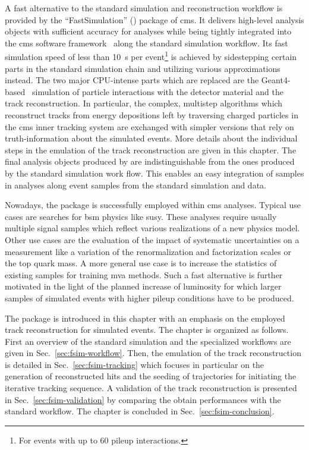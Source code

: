 A fast alternative to the standard simulation and reconstruction workflow is provided by the ``FastSimulation'' (\FSIM[format=hyperbf]) package of \gls{cms}. It delivers high-level analysis objects with sufficient accuracy for analyses while being tightly integrated into the \gls{cms} software framework~\cite{Bayatian:922757} along the standard simulation workflow. Its fast simulation speed of less than 10~s per event\footnote{For events with up to 60 pileup interactions.} is achieved by sidestepping certain parts in the standard simulation chain and utilizing various approximations instead. The two major CPU-intense parts which are replaced are the Geant4-based~\cite{Agostinelli2003250} simulation of particle interactions with the detector material and the track reconstruction. In particular, the complex, multistep algorithms which reconstruct tracks from energy depositions left by traversing charged particles in the \gls{cms} inner tracking system are exchanged with simpler versions that rely on truth-information about the simulated events. More details about the individual steps in the emulation of the track reconstruction are given in this chapter. The final analysis objects produced by \FSIM are indistinguishable from the ones produced by the standard simulation work flow. This enables an easy integration of \FSIM samples in analyses along event samples from the standard simulation and data.

Nowadays, the \FSIM package is successfully employed within \gls{cms} analyses. Typical use cases are searches for \acrfull{bsm} physics like \acrfull{susy}. These analyses require usually multiple signal samples which reflect various realizations of a new physics model. Other use cases are the evaluation of the impact of systematic uncertainties on a measurement like a variation of the renormalization and factorization scales or the top quark mass. A more general use case is to increase the statistics of existing samples for training \acrfull{mva} methods. Such a fast alternative is further motivated in the light of the planned increase of luminosity for which larger samples of simulated events with higher pileup conditions have to be produced.

The \FSIM package is introduced in this chapter with an emphasis on the employed track reconstruction for simulated events. The chapter is organized as follows. First an overview of the standard simulation and the specialized \FSIM workflows are given in Sec.~\ref{sec:fsim-workflow}. Then, the emulation of the track reconstruction is detailed in Sec.~\ref{sec:fsim-tracking} which focuses in particular on the generation of reconstructed hits and the seeding of trajectories for initiating the iterative tracking sequence. A validation of the track reconstruction is presented in Sec.~\ref{sec:fsim-validation} by comparing the obtain performances with the standard workflow. The chapter is concluded in Sec.~\ref{sec:fsim-conclusion}.



